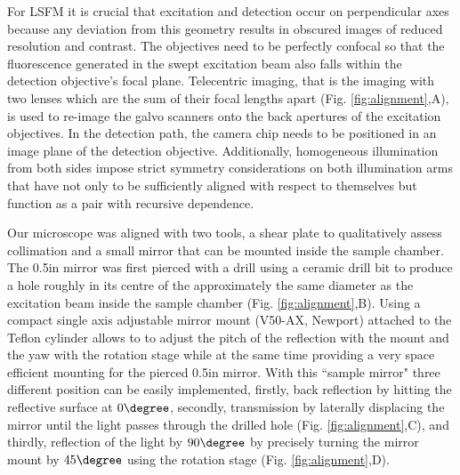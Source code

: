 \documentclass[12pt]{spieman}  %
\begin{document}
\begin{spacing}{2}
For LSFM it is crucial that excitation and detection occur on perpendicular axes because any deviation from this geometry results in obscured images of reduced resolution and contrast. The objectives need to be perfectly confocal so that the fluorescence generated in the swept excitation beam also falls within the detection objective's focal plane. Telecentric imaging, that is the imaging with two lenses which are the sum of their focal lengths apart (Fig. \ref{fig:alignment},A), is used to re-image the galvo scanners onto the back apertures of the excitation objectives. In the detection path, the camera chip needs to be positioned in an image plane of the detection objective. Additionally, homogeneous illumination from both sides impose strict symmetry considerations on both illumination arms that have not only to be sufficiently aligned with respect to themselves but function as a pair with recursive dependence. 

Our microscope was aligned with two tools, a shear plate to qualitatively assess collimation and a small mirror that can be mounted inside the sample chamber. The 0.5in mirror was first pierced with a drill using a ceramic drill bit to produce a hole roughly in its centre of the approximately the same diameter as the excitation beam inside the sample chamber (Fig. \ref{fig:alignment},B). Using a compact single axis adjustable mirror mount (V50-AX, Newport) attached to the Teflon cylinder allows to to adjust the pitch of the reflection with the mount and the yaw with the rotation stage while at the same time providing a very space efficient mounting for the pierced 0.5in mirror. With this ``sample mirror" three different position can be easily implemented, firstly, back reflection by hitting the reflective surface at $0\degree$, secondly, transmission by laterally displacing the mirror until the light passes through the drilled hole (Fig. \ref{fig:alignment},C), and thirdly, reflection of the light by $90\degree$ by precisely turning the mirror mount by $45\degree$ using the rotation stage (Fig. \ref{fig:alignment},D). 


\end{spacing}
\end{document}
